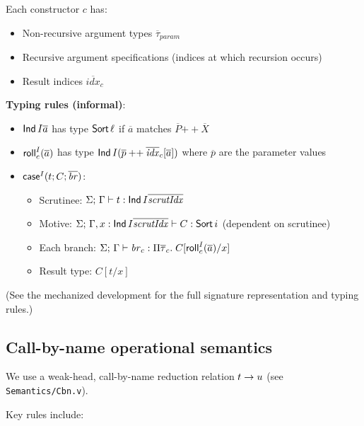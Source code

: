 Each constructor \(c\) has:
\begin{itemize}
\item Non-recursive argument types \(\overline{\tau}_{\mathit{param}}\)
\item Recursive argument specifications (indices at which recursion occurs)
\item Result indices \(\overline{\mathit{idx}}_c\)
\end{itemize}

\textbf{Typing rules (informal)}:
\begin{itemize}
\item \(\mathsf{Ind}\,I{\overline{a}}\) has type \(\mathsf{Sort}\,\ell\) if \(\overline{a}\) matches \(\overline{P} \mathbin{++} \overline{X}\)
\item \(\mathsf{roll}^{I}_{c}(\overline{a})\) has type \(\mathsf{Ind}\,I{(\overline{p} \mathbin{++} \overline{\mathit{idx}}_c[\overline{a}])}\) where \(\overline{p}\) are the parameter values
\item \(\mathsf{case}^{I}(t;C;\overline{\mathit{br}})\):
  \begin{itemize}
  \item Scrutinee: \(\Sigma;\,\Gamma \vdash t : \mathsf{Ind}\,I{\overline{\mathit{scrutIdx}}}\)
  \item Motive: \(\Sigma;\,\Gamma, x:\mathsf{Ind}\,I{\overline{\mathit{scrutIdx}}} \vdash C : \mathsf{Sort}\,i\) (dependent on scrutinee)
  \item Each branch: \(\Sigma;\,\Gamma \vdash \mathit{br}_c : \Pi\overline{\tau}_c.\; C[\mathsf{roll}^{I}_{c}(\overline{a})/x]\)
  \item Result type: \(C[t/x]\)
  \end{itemize}
\end{itemize}

(See the mechanized development for the full signature representation and typing rules.)

\subsection{Call-by-name operational semantics}

We use a weak-head, call-by-name reduction relation \(t \to u\) (see \texttt{Semantics/Cbn.v}).

\smallskip

Key rules include:


